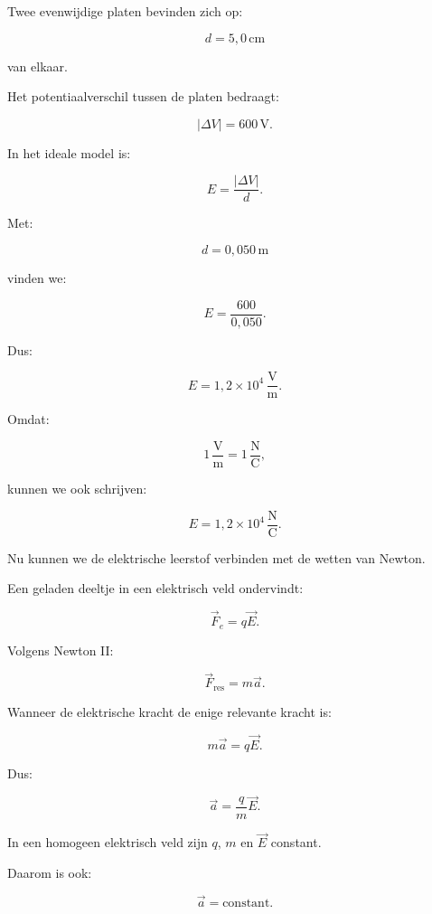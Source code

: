 \documentclass{ximera}
\begin{document}
\begin{voorbeeld}

Twee evenwijdige platen bevinden zich op:

\[
d=5{,}0\,\mathrm{cm}
\]

van elkaar.

Het potentiaalverschil tussen de platen bedraagt:

\[
|\Delta V|=600\,\mathrm V.
\]

In het ideale model is:

\[
E=\frac{|\Delta V|}{d}.
\]

Met:

\[
d=0{,}050\,\mathrm m
\]

vinden we:

\[
E
=
\frac{600}{0{,}050}.
\]

Dus:

\[
\boxed{
E=1{,}2\times10^4\,\mathrm{\frac Vm}.
}
\]

Omdat:

\[
1\,\mathrm{\frac Vm}
=
1\,\mathrm{\frac NC},
\]

kunnen we ook schrijven:

\[
\boxed{
E=1{,}2\times10^4\,\mathrm{\frac NC}.
}
\]

\end{voorbeeld}




Nu kunnen we de elektrische leerstof verbinden met de wetten van
Newton.

Een geladen deeltje in een elektrisch veld ondervindt:

\[
\vec F_e=q\vec E.
\]

Volgens Newton II:

\[
\vec F_\mathrm{res}=m\vec a.
\]

Wanneer de elektrische kracht de enige relevante kracht is:

\[
m\vec a=q\vec E.
\]

Dus:

\[
\boxed{
\vec a
=
\frac{q}{m}\vec E.
}
\]


In een homogeen elektrisch veld zijn $q$, $m$ en $\vec E$ constant.

Daarom is ook:

\[
\boxed{
\vec a=\text{constant}.
}
\]
\end{document}
